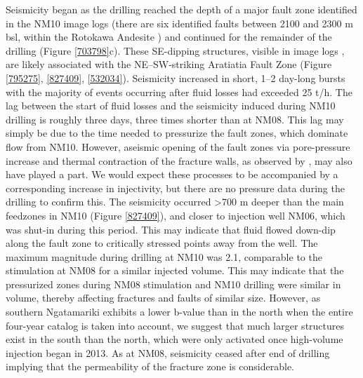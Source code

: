 Seismicity began as the drilling reached the depth of a major fault zone identified in the NM10 image logs (there are six identified faults between 2100 and 2300 m bsl, within the Rotokawa Andesite \cite{nm10_report}) and continued for the remainder of the drilling (Figure \ref{703798}c). These SE-dipping structures, visible in image logs \citep{nm10_report}, are likely associated with the NE--SW-striking Aratiatia Fault Zone (Figure \ref{795275}, \ref{827409}, \ref{532034}). Seismicity increased in short, 1--2 day-long bursts with the majority of events occurring after fluid losses had exceeded 25 t/h. The lag between the start of fluid losses and the seismicity induced during NM10 drilling is roughly three days, three times shorter than at NM08. This lag may simply be due to the time needed to pressurize the fault zones, which dominate flow from NM10. However, aseismic opening of the fault zones via pore-pressure increase and thermal contraction of the fracture walls, as observed by \citet{Guglielmi_2015}, may also have played a part. We would expect these processes to be accompanied by a corresponding increase in \gls{injectivity}, but there are no pressure data during the drilling to confirm this. The seismicity occurred \textgreater700 m deeper than the main \glspl{feedzone} in NM10 (Figure \ref{827409}), and closer to injection well NM06, which was shut-in during this period. This may indicate that fluid flowed down-dip along the fault zone to critically stressed points away from the well. The maximum magnitude during drilling at NM10 was 2.1, comparable to the \gls{stimulation} at NM08 for a similar injected volume. This may indicate that the pressurized zones during NM08 stimulation and NM10 drilling were similar in volume, thereby affecting fractures and faults of similar size. However, as southern Ngatamariki exhibits a lower b-value than in the north when the entire four-year catalog is taken into account, we suggest that much larger structures exist in the south than the north, which were only activated once high-volume injection began in 2013. As at NM08, seismicity ceased after end of drilling implying that the \gls{permeability} of the fracture zone is considerable.

